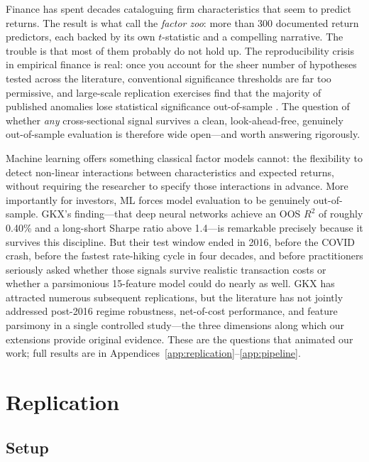 \documentclass[11pt,a4paper]{article}
\begin{document}
Finance has spent decades cataloguing firm characteristics that seem to predict returns. The result is what \citet{Harvey2016} call the \textit{factor zoo}: more than 300 documented return predictors, each backed by its own $t$-statistic and a compelling narrative. The trouble is that most of them probably do not hold up. The reproducibility crisis in empirical finance is real: once you account for the sheer number of hypotheses tested across the literature, conventional significance thresholds are far too permissive, and large-scale replication exercises find that the majority of published anomalies lose statistical significance out-of-sample \citep{Harvey2016}. The question of whether \textit{any} cross-sectional signal survives a clean, look-ahead-free, genuinely out-of-sample evaluation is therefore wide open---and worth answering rigorously.

Machine learning offers something classical factor models cannot: the flexibility to detect non-linear interactions between characteristics and expected returns, without requiring the researcher to specify those interactions in advance. More importantly for investors, ML forces model evaluation to be genuinely out-of-sample. GKX's finding---that deep neural networks achieve an OOS $R^2$ of roughly 0.40\% and a long-short Sharpe ratio above 1.4---is remarkable precisely because it survives this discipline. But their test window ended in 2016, before the COVID crash, before the fastest rate-hiking cycle in four decades, and before practitioners seriously asked whether those signals survive realistic transaction costs or whether a parsimonious 15-feature model could do nearly as well. GKX has attracted numerous subsequent replications, but the literature has not jointly addressed post-2016 regime robustness, net-of-cost performance, and feature parsimony in a single controlled study---the three dimensions along which our extensions provide original evidence. These are the questions that animated our work; full results are in Appendices~\ref{app:replication}--\ref{app:pipeline}.

\section{Replication}

\subsection{Setup}
\end{document}
